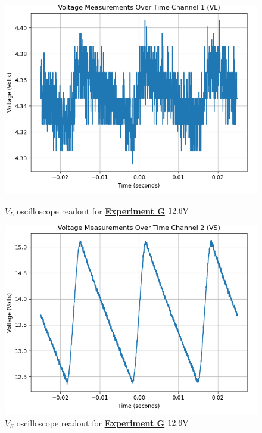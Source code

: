\documentclass[
	letterpaper
	12pt
]{template}
\newcommand{\bref}[2]{\textbf{\hyperref[#1]{#2}}}
\begin{document}
\begin{figure}[H]\label{data::G2}
	\centering
	\begin{minipage}[c]{0.45\textwidth}
		\centering
		\includegraphics[width=\textwidth]{figures/G/2--ch1.png}
	    \caption{$V_{L}$ oscilloscope readout for \bref{exp::G}{Experiment G} $12.6\unit V$ }
	\end{minipage}
	\hfill
	\begin{minipage}[c]{0.45\textwidth}
		\centering
		\includegraphics[width=\textwidth]{figures/G/2--ch2.png}
	    \caption{$V_{S}$ oscilloscope readout for \bref{exp::G}{Experiment G} $12.6\unit V$ }
	\end{minipage}
\end{figure}
\end{document}
